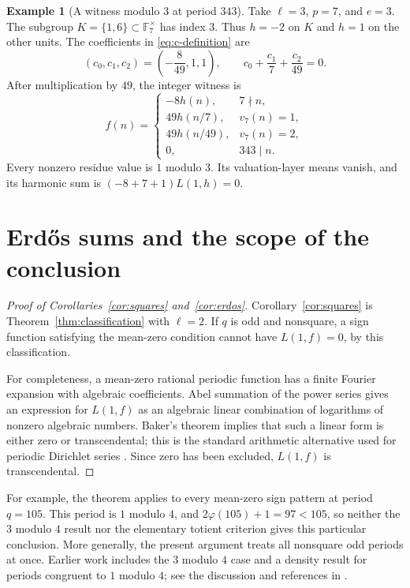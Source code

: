 \documentclass[11pt,a4paper]{article}
\theoremstyle{definition}
\newtheorem{example}[theorem]{Example}
\theoremstyle{remark}
\newcommand{\F}{\mathbb F}
\begin{document}
\begin{example}[A witness modulo $3$ at period $343$]\label{ex:343}
Take $\ell=3$, $p=7$, and $e=3$. The subgroup
$K=\{1,6\}\subset\F_7^\times$ has index $3$. Thus $h=-2$ on $K$
and $h=1$ on the other units. The coefficients in
\eqref{eq:c-definition} are
\[
 (c_0,c_1,c_2)=\left(-\frac8{49},1,1\right),
 \qquad c_0+\frac{c_1}{7}+\frac{c_2}{49}=0.
\]
After multiplication by $49$, the integer witness is
\[
 f(n)=
 \begin{cases}
 -8h(n),&7\nmid n,\\
 49h(n/7),&v_7(n)=1,\\
 49h(n/49),&v_7(n)=2,\\
 0,&343\mid n.
 \end{cases}
\]
Every nonzero residue value is $1$ modulo $3$. Its valuation-layer
means vanish, and its harmonic sum is
$(-8+7+1)L(1,h)=0$.
\end{example}

\section{Erd\H{o}s sums and the scope of the conclusion}

\begin{proof}[Proof of Corollaries~\ref{cor:squares} and~\ref{cor:erdos}]
Corollary~\ref{cor:squares} is Theorem~\ref{thm:classification} with
$\ell=2$. If $q$ is odd and nonsquare, a sign function satisfying the
mean-zero condition cannot have $L(1,f)=0$, by this classification.

For completeness, a mean-zero rational periodic function has a finite
Fourier expansion with algebraic coefficients. Abel summation of the
power series gives an expression for $L(1,f)$ as an algebraic linear
combination of logarithms of nonzero algebraic numbers. Baker's
theorem implies that such a linear form is either zero or
transcendental; this is the standard arithmetic alternative used for
periodic Dirichlet series \cite{BBW,MurtyPathak}. Since zero has been
excluded, $L(1,f)$ is transcendental.
\end{proof}

For example, the theorem applies to every mean-zero sign pattern at
period $q=105$. This period is $1$ modulo $4$, and
$2\varphi(105)+1=97<105$, so neither the $3$ modulo $4$ result nor
the elementary totient criterion gives this particular conclusion.
More generally, the present argument treats all nonsquare odd periods
at once. Earlier work includes the $3$ modulo $4$ case and a
density result for periods congruent to $1$ modulo $4$; see the
discussion and references in \cite{ChatterjeeMurty}.
\end{document}
